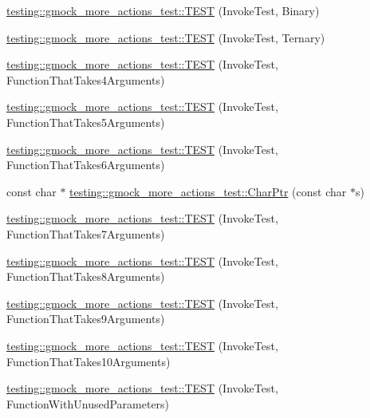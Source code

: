 \begin{DoxyCompactItemize}
\hyperlink{namespacetesting_1_1gmock__more__actions__test_a906bd5cc7aa38e2cc861a9732481fce7}{testing\+::gmock\+\_\+more\+\_\+actions\+\_\+test\+::\+T\+E\+ST} (Invoke\+Test, Binary)
\item 
\hyperlink{namespacetesting_1_1gmock__more__actions__test_a424fb6113c6c1ab2157edf854a4ae9fe}{testing\+::gmock\+\_\+more\+\_\+actions\+\_\+test\+::\+T\+E\+ST} (Invoke\+Test, Ternary)
\item 
\hyperlink{namespacetesting_1_1gmock__more__actions__test_a17f41c1f7f180371d4d240089cdff0dd}{testing\+::gmock\+\_\+more\+\_\+actions\+\_\+test\+::\+T\+E\+ST} (Invoke\+Test, Function\+That\+Takes4\+Arguments)
\item 
\hyperlink{namespacetesting_1_1gmock__more__actions__test_a3b6b1b682295a1d04d57374445359e94}{testing\+::gmock\+\_\+more\+\_\+actions\+\_\+test\+::\+T\+E\+ST} (Invoke\+Test, Function\+That\+Takes5\+Arguments)
\item 
\hyperlink{namespacetesting_1_1gmock__more__actions__test_a9a6c89b83ba253838d05d7ee5da7d954}{testing\+::gmock\+\_\+more\+\_\+actions\+\_\+test\+::\+T\+E\+ST} (Invoke\+Test, Function\+That\+Takes6\+Arguments)
\item 
const char $\ast$ \hyperlink{namespacetesting_1_1gmock__more__actions__test_aa19ac39aaa785adeb8d7837d58b824f3}{testing\+::gmock\+\_\+more\+\_\+actions\+\_\+test\+::\+Char\+Ptr} (const char $\ast$s)
\item 
\hyperlink{namespacetesting_1_1gmock__more__actions__test_af4756ff87444dc6deb438a350ab5527f}{testing\+::gmock\+\_\+more\+\_\+actions\+\_\+test\+::\+T\+E\+ST} (Invoke\+Test, Function\+That\+Takes7\+Arguments)
\item 
\hyperlink{namespacetesting_1_1gmock__more__actions__test_a48d99224a323afa3c9772a868dd60214}{testing\+::gmock\+\_\+more\+\_\+actions\+\_\+test\+::\+T\+E\+ST} (Invoke\+Test, Function\+That\+Takes8\+Arguments)
\item 
\hyperlink{namespacetesting_1_1gmock__more__actions__test_a65d674aacb46d8bf79dbdfe0d49df442}{testing\+::gmock\+\_\+more\+\_\+actions\+\_\+test\+::\+T\+E\+ST} (Invoke\+Test, Function\+That\+Takes9\+Arguments)
\item 
\hyperlink{namespacetesting_1_1gmock__more__actions__test_a8939ea1ccb0d8787c926c92441b27f6c}{testing\+::gmock\+\_\+more\+\_\+actions\+\_\+test\+::\+T\+E\+ST} (Invoke\+Test, Function\+That\+Takes10\+Arguments)
\item 
\hyperlink{namespacetesting_1_1gmock__more__actions__test_a0dd6901e637db57c56f1cf8052b6e1bf}{testing\+::gmock\+\_\+more\+\_\+actions\+\_\+test\+::\+T\+E\+ST} (Invoke\+Test, Function\+With\+Unused\+Parameters)

\end{DoxyCompactItemize}
